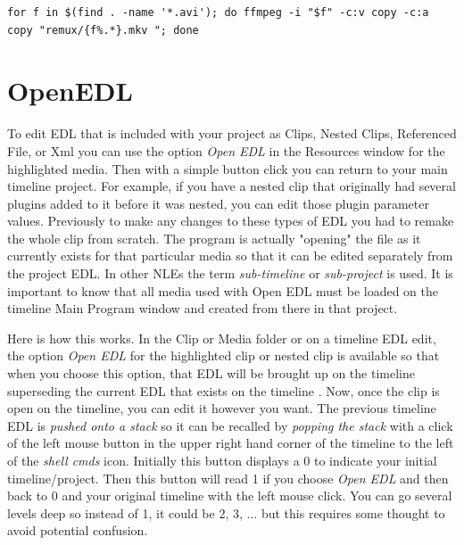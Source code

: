 \begin{lstlisting}[numbers=none]
	for f in $(find . -name '*.avi'); do ffmpeg -i "$f" -c:v copy -c:a copy "remux/{f%.*}.mkv "; done
\end{lstlisting}

\section{OpenEDL}%
\label{sec:openedl}

To edit EDL  that is included with your project as Clips, Nested
Clips, Referenced File, or Xml you can use the option \textit{Open
	EDL} in the Resources window for the highlighted media.  Then
with a simple button click you can return to your main timeline project.
For example, if you have a nested clip that originally had several
plugins added to it before it was nested, you can edit those plugin
parameter values. Previously to make any changes to these types of
EDL you had to remake the whole clip from scratch.  The program is 
actually "opening" the file as it currently exists for that particular
media so that it can be edited separately from the project EDL. In other NLEs the term \textit{sub-timeline} or \textit{sub-project} is used.
It is important to know that all media used with Open EDL must be loaded on the timeline Main Program window and created from there in that project.

Here is how this works. In the Clip  or Media folder  or on a timeline
EDL edit, the option \textit{Open EDL} for the highlighted clip or
nested clip is available so that when you choose this option, that
EDL will be brought up on the timeline superseding the current EDL
that exists on the timeline .  Now, once the clip is open on the
timeline, you can edit it however you want. The previous timeline
EDL is \textit{pushed onto a stack} so it can be recalled by
\textit{popping the stack} with a click of the left mouse button in
the upper right hand corner of the timeline to the left of the
\textit{shell cmds} icon.  Initially this button displays a 0 to
indicate your initial timeline/project.  Then this button will read
1 if you choose \textit{Open EDL} and then back to 0 and your
original timeline with the left mouse click.  You can go several
levels deep so instead of 1, it could be 2, 3, $\dots$ but this
requires some thought to avoid potential confusion.

